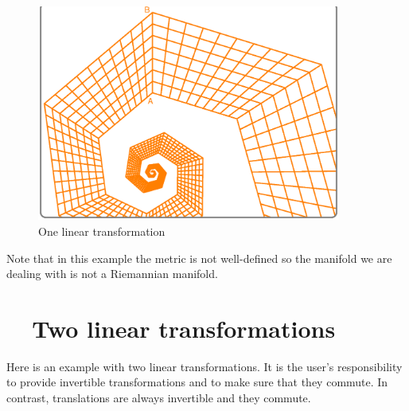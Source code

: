 \begin{figure}[ht] \centering
  \includegraphics[width=100mm]{sector-2.eps}
  \caption{One linear transformation}
  \label{\numb section 7.\numb fig 10}
\end{figure}

Note that in this example the metric is not well-defined
so the manifold we are dealing with is not a Riemannian manifold.


\section{~~Two linear transformations}\label{\numb section 7.\numb parag 15}

Here is an example with two linear transformations.
It is the user's responsibility to provide invertible transformations and
to make sure that they commute.
In contrast, translations are always invertible and they commute.

